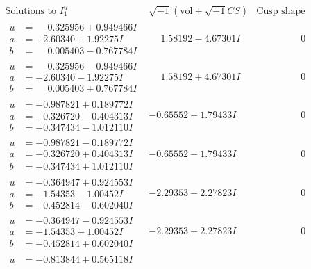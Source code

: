 \documentclass[1p]{elsarticle_modified}
\theoremstyle{definition}
\newcommand{\I}{\sqrt{-1}}
\begin{document}
$$\begin{array}{c|c|c}  
\text{Solutions to }I^u_{1}& \I (\text{vol} + \sqrt{-1}CS) & \text{Cusp shape}\\
 \hline 
\begin{aligned}
u &= \phantom{-}0.325956 + 0.949466 I \\
a &= -2.60340 + 1.92275 I \\
b &= \phantom{-}0.005403 - 0.767784 I\end{aligned}
 & \phantom{-}1.58192 - 4.67301 I & \phantom{-0.000000 } 0 \\ \hline\begin{aligned}
u &= \phantom{-}0.325956 - 0.949466 I \\
a &= -2.60340 - 1.92275 I \\
b &= \phantom{-}0.005403 + 0.767784 I\end{aligned}
 & \phantom{-}1.58192 + 4.67301 I & \phantom{-0.000000 } 0 \\ \hline\begin{aligned}
u &= -0.987821 + 0.189772 I \\
a &= -0.326720 - 0.404313 I \\
b &= -0.347434 - 1.012110 I\end{aligned}
 & -0.65552 + 1.79433 I & \phantom{-0.000000 } 0 \\ \hline\begin{aligned}
u &= -0.987821 - 0.189772 I \\
a &= -0.326720 + 0.404313 I \\
b &= -0.347434 + 1.012110 I\end{aligned}
 & -0.65552 - 1.79433 I & \phantom{-0.000000 } 0 \\ \hline\begin{aligned}
u &= -0.364947 + 0.924553 I \\
a &= -1.54353 - 1.00452 I \\
b &= -0.452814 - 0.602040 I\end{aligned}
 & -2.29353 - 2.27823 I & \phantom{-0.000000 } 0 \\ \hline\begin{aligned}
u &= -0.364947 - 0.924553 I \\
a &= -1.54353 + 1.00452 I \\
b &= -0.452814 + 0.602040 I\end{aligned}
 & -2.29353 + 2.27823 I & \phantom{-0.000000 } 0 \\ \hline\begin{aligned}
u &= -0.813844 + 0.565118 I \\

\end{aligned}
\end{array}$$
\end{document}
